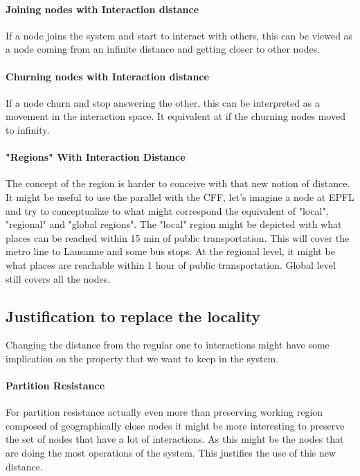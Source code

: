 \documentclass[a4paper,11pt,oneside]{report}
\begin{document}
\paragraph{Joining nodes with Interaction distance}
If a node joins the system and start to interact with others, this can be
viewed as a node coming from an infinite distance and getting closer to other
nodes.

\paragraph{Churning nodes with Interaction distance}
If a node churn and stop answering the other, this can be interpreted as a
movement in the interaction space. It equivalent at if the churning nodes moved
to infinity.  

\paragraph{"Regions" With Interaction Distance} \label{par:section-example}
The concept of the region is harder to conceive with that new notion of
distance. It might be useful to use the parallel with the CFF, let's imagine a
node at EPFL and try to conceptualize to what might correspond the equivalent
of "local", "regional" and "global regions". The "local" region might be
depicted with what places can be reached within 15 min of public
transportation. This will cover the metro line to Lausanne and some bus stops.
At the regional level, it might be what places are reachable within 1 hour of
public transportation. Global level still covers all the nodes.

\subsection{Justification to replace the locality}
Changing the distance from the regular one to interactions might have some
implication on the property that we want to keep in the system. 

\paragraph{Partition Resistance}
For partition resistance actually even more than preserving working region
composed of geographically close nodes it might be more interesting to preserve
the set of nodes that have a lot of interactions. As this might be the nodes
that are doing the most operations of the system. This justifies the use of
this new distance.
\end{document}

